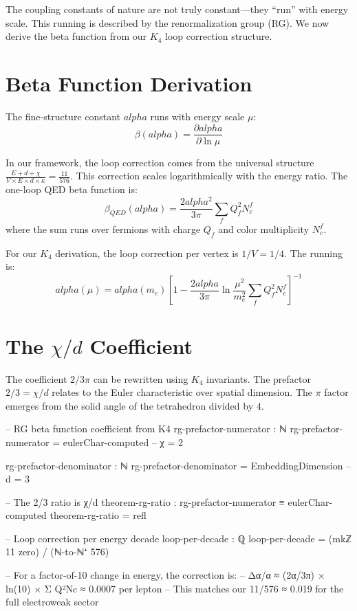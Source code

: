 \documentclass[11pt,a4paper]{book}
\def\alpha{alpha}%
\def\text#1{#1}%
\begin{document}
The coupling constants of nature are not truly constant---they ``run'' with energy scale. This running is described by the renormalization group (RG). We now derive the beta function from our $K_4$ loop correction structure.

\section{Beta Function Derivation}

The fine-structure constant $\alpha$ runs with energy scale $\mu$:
\[
\beta(\alpha) = \frac{\partial \alpha}{\partial \ln \mu}
\]

In our framework, the loop correction comes from the universal structure $\frac{E + d + \chi}{V \times E \times d \times \kappa} = \frac{11}{576}$. This correction scales logarithmically with the energy ratio. The one-loop QED beta function is:
\[
\beta_{\text{QED}}(\alpha) = \frac{2\alpha^2}{3\pi} \sum_f Q_f^2 N_c^f
\]
where the sum runs over fermions with charge $Q_f$ and color multiplicity $N_c^f$.

For our $K_4$ derivation, the loop correction per vertex is $1/V = 1/4$. The running is:
\[
\alpha(\mu) = \alpha(m_e) \left[ 1 - \frac{2\alpha}{3\pi} \ln\frac{\mu^2}{m_e^2} \sum_f Q_f^2 N_c^f \right]^{-1}
\]

\section[The chi/d Coefficient]{The $\chi/d$ Coefficient}

The coefficient $2/3\pi$ can be rewritten using $K_4$ invariants. The prefactor $2/3 = \chi/d$ relates to the Euler characteristic over spatial dimension. The $\pi$ factor emerges from the solid angle of the tetrahedron divided by $4$.

\begin{code}
-- RG beta function coefficient from K4
rg-prefactor-numerator : ℕ
rg-prefactor-numerator = eulerChar-computed  -- χ = 2

rg-prefactor-denominator : ℕ
rg-prefactor-denominator = EmbeddingDimension  -- d = 3

-- The 2/3 ratio is χ/d
theorem-rg-ratio : rg-prefactor-numerator ≡ eulerChar-computed
theorem-rg-ratio = refl

-- Loop correction per energy decade
loop-per-decade : ℚ
loop-per-decade = (mkℤ 11 zero) / (ℕ-to-ℕ⁺ 576)

-- For a factor-of-10 change in energy, the correction is:
-- Δα/α ≈ (2α/3π) × ln(10) × Σ Q²Nc ≈ 0.0007 per lepton
-- This matches our 11/576 ≈ 0.019 for the full electroweak sector
\end{code}
\end{document}
